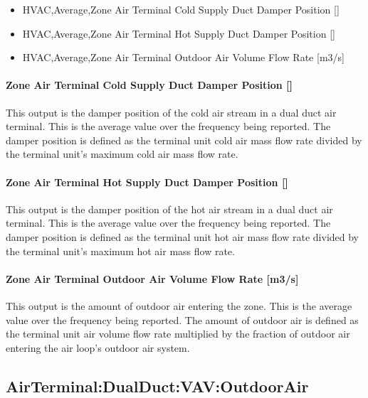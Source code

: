 \begin{itemize}
\item
  HVAC,Average,Zone Air Terminal Cold Supply Duct Damper Position {[]}
\item
  HVAC,Average,Zone Air Terminal Hot Supply Duct Damper Position {[]}
\item
  HVAC,Average,Zone Air Terminal Outdoor Air Volume Flow Rate {[}m3/s{]}
\end{itemize}

\paragraph{Zone Air Terminal Cold Supply Duct Damper Position {[]}}\label{zone-air-terminal-cold-supply-duct-damper-position-1}

This output is the damper position of the cold air stream in a dual duct air terminal. This is the average value over the frequency being reported. The damper position is defined as the terminal unit cold air mass flow rate divided by the terminal unit's maximum cold air mass flow rate.

\paragraph{Zone Air Terminal Hot Supply Duct Damper Position {[]}}\label{zone-air-terminal-hot-supply-duct-damper-position-1}

This output is the damper position of the hot air stream in a dual duct air terminal. This is the average value over the frequency being reported. The damper position is defined as the terminal unit hot air mass flow rate divided by the terminal unit's maximum hot air mass flow rate.

\paragraph{Zone Air Terminal Outdoor Air Volume Flow Rate {[}m3/s{]}}

This output is the amount of outdoor air entering the zone. This is the average value over the frequency being reported. The amount of outdoor air is defined as the terminal unit air volume flow rate multiplied by the fraction of outdoor air entering the air loop's outdoor air system.

\subsection{AirTerminal:DualDuct:VAV:OutdoorAir}\label{airterminaldualductvavoutdoorair}

